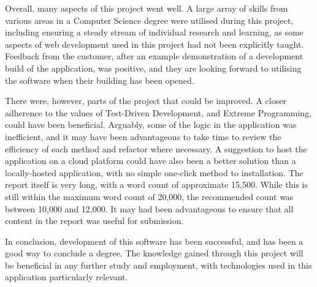 Overall, many aspects of this project went well. A large array of skills from various areas in a Computer Science degree were utilised during this project, including ensuring a steady stream of individual research and learning, as some aspects of web development used in this project had not been explicitly taught. Feedback from the customer, after an example demonstration of a development build of the application, was positive, and they are looking forward to utilising the software when their building has been opened.

There were, however, parts of the project that could be improved. A closer adherence to the values of Test-Driven Development, and Extreme Programming, could have been beneficial. Arguably, some of the logic in the application was inefficient, and it may have been advantageous to take time to review the efficiency of each method and refactor where necessary. A suggestion to host the application on a cloud platform could have also been a better solution than a locally-hosted application, with no simple one-click method to installation. The report itself is very long, with a word count of approximate 15,500. While this is still within the maximum word count of 20,000, the recommended count was between 10,000 and 12,000. It may had been advantageous to ensure that all content in the report was useful for submission.

In conclusion, development of this software has been successful, and has been a good way to conclude a degree. The knowledge gained through this project will be beneficial in any further study and employment, with technologies used in this application particularly relevant.

